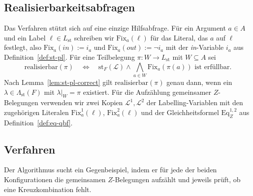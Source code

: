\subsection{Realisierbarkeitsabfragen}
\label{subsec:singl-direkt-realize}

Das Verfahren stützt sich auf eine einzige
Hilfsabfrage. Für ein Argument \(a\in A\) und ein Label
\(\ell\in L_{\mathrm{st}}\) schreiben wir \(\mathrm{Fix}_a(\ell)\) für das
Literal, das \(a\) auf \(\ell\) festlegt, also \(\mathrm{Fix}_a(\mathit{in}):=
i_a\) und \(\mathrm{Fix}_a(\mathit{out}):=\neg i_a\) mit der \textit{in}-Variable
\(i_a\) aus Definition~\ref{def:st-pl}. Für eine Teilbelegung
\(\pi:W\to L_{\mathrm{st}}\) mit \(W\subseteq A\) sei
\[
    \mathrm{realisierbar}(\pi)
    \quad\Longleftrightarrow\quad
    \mathrm{st}_F(\mathcal L)\land
    \bigwedge_{a\in W}\mathrm{Fix}_a(\pi(a))
    \text{ ist erfüllbar.}
\]
Nach Lemma~\ref{lem:st-pl-correct} gilt \(\mathrm{realisierbar}(\pi)\) genau
dann, wenn ein \(\lambda\in\Lambda_{\mathrm{st}}(F)\) mit \(\lambda|_W=\pi\)
existiert. Für die Aufzählung gemeinsamer \(Z\)-Belegungen verwenden wir
zwei Kopien \(\mathcal L^1,\mathcal L^2\) der Labelling-Variablen mit den
zugehörigen Literalen \(\mathrm{Fix}^1_a(\ell)\), \(\mathrm{Fix}^2_a(\ell)\)
und der Gleichheitsformel \(\mathrm{Eq}^{1,2}_Z\) aus
Definition~\ref{def:eq-qbf}.

\subsection{Verfahren}
\label{subsec:singl-direkt-verfahren}

Der Algorithmus sucht ein Gegenbeispiel, indem er für jede der beiden
Konfigurationen die gemeinsamen \(Z\)-Belegungen aufzählt und jeweils prüft,
ob eine Kreuzkombination fehlt.

